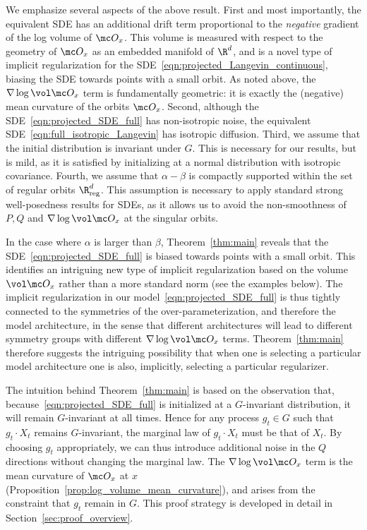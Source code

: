 \documentclass[twoside,a4paper,11pt]{article}
\newcommand{\reg}{\mathrm{reg}}
\theoremstyle{plain}
\begin{document}
 We emphasize several aspects of the above result. First and most importantly,
the equivalent SDE has an additional drift term proportional
to the {\it negative} gradient of the log volume of $\mc O_x$.
This volume is measured with respect to the geometry 
of $\mc O_x$ as an embedded manifold of $\R^d$,
and is a novel type of implicit regularization for the SDE~\eqref{eqn:projected_Langevin_continuous}, biasing
the SDE towards points with a small orbit. As noted above, the $\nabla \log \vol \mc O_x$
term is fundamentally geometric: it is exactly the (negative) mean curvature
of the orbits $\mc O_x$. Second, although the SDE~\eqref{eqn:projected_SDE_full}
has non-isotropic noise, the equivalent SDE~\eqref{eqn:full_isotropic_Langevin} has isotropic
diffusion.
Third, we assume that the initial distribution is invariant under $G$.
This is necessary for our results, but is mild, as it is satisfied
by initializing
at a normal distribution with isotropic covariance. 
Fourth, we assume that $\alpha - \beta$ is compactly
supported within the set of regular orbits $\R^d_{\reg}$.
This assumption is necessary to apply standard strong
well-posedness results for SDEs, as it allows us
to avoid the non-smoothness of $P, Q$ and $\nabla \log \vol \mc O_x$ at the singular
orbits.

In the case where $\alpha$ is larger than $\beta$,
Theorem~\ref{thm:main} reveals that the SDE~\eqref{eqn:projected_SDE_full}
is biased towards points with a small orbit.
This identifies an intriguing new type
of implicit regularization based on the volume
$\vol \mc O_x$ rather than a more standard norm
(see the examples below).
The implicit regularization in our
model~\eqref{eqn:projected_SDE_full}
is thus tightly
connected to the symmetries of the over-parameterization,
and therefore the model architecture,
in the sense that different architectures
will lead to different symmetry groups with different
$\nabla \log \vol \mc O_x$ terms.
Theorem~\ref{thm:main} therefore suggests the intriguing possibility that when
one is selecting a particular model architecture one is also,
implicitly,
selecting a particular regularizer.

The intuition behind Theorem~\ref{thm:main}
is based on the observation
that, because~\eqref{eqn:projected_SDE_full}
is initialized at a $G$-invariant
distribution,
it will remain $G$-invariant
at all times.
Hence for any process
$g_t \in G$ such that 
$g_t \cdot X_t$ remains
$G$-invariant, the
marginal law of $g_t \cdot X_t$
must be that of $X_t$.
By choosing $g_t$ appropriately, we can thus
introduce additional noise in the $Q$ directions
without changing the marginal law.
The $\nabla\log \vol \mc O_x$ term
is the mean curvature of $\mc O_x$
at $x$ (Proposition~\ref{prop:log_volume_mean_curvature}),
and arises from the constraint
that $g_t$ remain in $G$.
This proof strategy
is developed in detail in Section~\ref{sec:proof_overview}.
\end{document}
